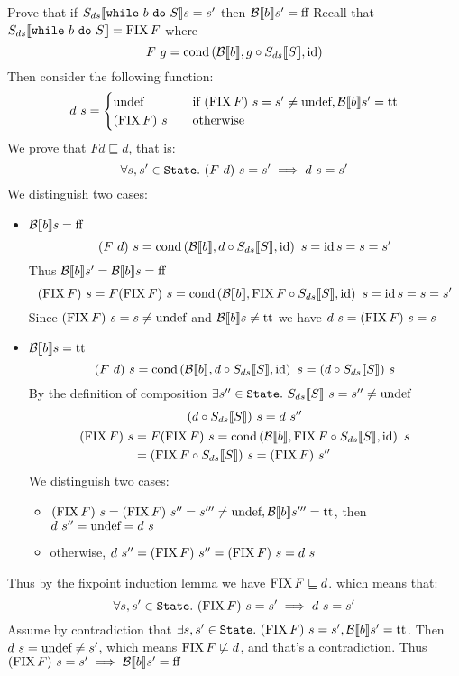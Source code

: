 \begin{exercise}{
    Prove that if $\Sds{\wwhile{b}{S}} s = s'$ then $\Bool{b} s' = \False$
}
    Recall that $\Sds{\wwhile{b}{S}} = \FIX F$ where
    \[ F\ g= \cond{\Bool{b}}{g \circ \Sds{S}}{\id} \]
    Then consider the following function:
    \[
        d\ s = \begin{cases}
            \undef &\quad \text{if } (\FIX F)\ s = s' \neq \undef, \Bool{b} s' = \True \\
            (\FIX F)\ s &\quad \text{otherwise}
        \end{cases}
    \]
    We prove that $F d \sqsubseteq d$, that is:
    \[ \forall s, s' \in \State.\ (F\ d)\ s = s' \implies d\ s = s' \]
    We distinguish two cases:
    \begin{itemize}
        \item $\Bool{b} s = \False$
            \[ (F\ d)\ s = \cond{\Bool{b}}{d \circ \Sds{S}}{\id}\ s = \id s = s = s' \]
            Thus $\Bool{b} s' = \Bool{b} s = \False$
            \[ (\FIX F)\ s = F(\FIX F)\ s = \cond{\Bool{b}}{\FIX F \circ \Sds{S}}{\id}\ s = \id s = s = s' \]
            Since $(\FIX F)\ s = s \neq \undef$ and $\Bool{b} s \neq \True$ we have $d\ s = (\FIX F)\ s = s$
        \item $\Bool{b} s = \True$
            \[ (F\ d)\ s = \cond{\Bool{b}}{d \circ \Sds{S}}{\id}\ s = (d \circ \Sds{S})\ s \]
            By the definition of composition $\exists s'' \in \State.\ \Sds{S}\ s = s'' \neq \undef$
            \begin{gather*}
                (d \circ \Sds{S})\ s = d\ s'' \\
                \begin{aligned}
                    (\FIX F)\ s &= F(\FIX F)\ s = \cond{\Bool{b}}{\FIX F \circ \Sds{S}}{\id}\ s \\
                    &= (\FIX F \circ \Sds{S})\ s = (\FIX F)\ s''
                \end{aligned}
            \end{gather*}
            We distinguish two cases:
            \begin{itemize}
                \item $(\FIX F)\ s = (\FIX F)\ s'' = s''' \neq \undef, \Bool{b} s''' = \True$, then $d\ s'' = \undef = d\ s$
                \item otherwise, $d\ s'' = (\FIX F)\ s'' = (\FIX F)\ s = d\ s$
            \end{itemize}
    \end{itemize}
    Thus by the fixpoint induction lemma we have $\FIX F \sqsubseteq d$. which means that:
    \[ \forall s, s' \in \State.\ (\FIX F)\ s = s' \implies d\ s = s' \]
    Assume by contradiction that $\exists s, s' \in \State.\ (\FIX F)\ s = s', \Bool{b} s' = \True $. Then $d\ s = \undef \neq s'$, which means $\FIX F \not\sqsubseteq d$, and that's a contradiction. Thus $(\FIX F)\ s = s' \implies \Bool{b} s' = \False$
\end{exercise}
